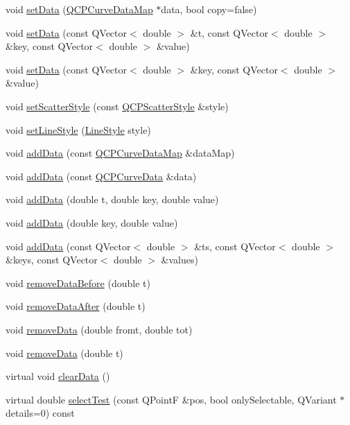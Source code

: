 \begin{DoxyCompactItemize}
\item 
void \hyperlink{classQCPCurve_a631ac886708460013b30052f49cbc9da}{set\-Data} (\hyperlink{qcustomplot_8h_a444d37ec9cb2951b3a7fe443c34d1658}{\-Q\-C\-P\-Curve\-Data\-Map} $\ast$data, bool copy=false)
\item 
void \hyperlink{classQCPCurve_affe80e011e2ced62a88f614acd6ab8d1}{set\-Data} (const \-Q\-Vector$<$ double $>$ \&t, const \-Q\-Vector$<$ double $>$ \&key, const \-Q\-Vector$<$ double $>$ \&value)
\item 
void \hyperlink{classQCPCurve_a963d4c45777deef15848a8f56172d066}{set\-Data} (const \-Q\-Vector$<$ double $>$ \&key, const \-Q\-Vector$<$ double $>$ \&value)
\item 
void \hyperlink{classQCPCurve_a55e43b44709bf50a35500644988aa706}{set\-Scatter\-Style} (const \hyperlink{classQCPScatterStyle}{\-Q\-C\-P\-Scatter\-Style} \&style)
\item 
void \hyperlink{classQCPCurve_a4a377ec863ff81a1875c3094a6177c19}{set\-Line\-Style} (\hyperlink{classQCPCurve_a2710e9f79302152cff794c6e16cc01f1}{\-Line\-Style} style)
\item 
void \hyperlink{classQCPCurve_a4e24023c3b9ac75440c7a260172c99af}{add\-Data} (const \hyperlink{qcustomplot_8h_a444d37ec9cb2951b3a7fe443c34d1658}{\-Q\-C\-P\-Curve\-Data\-Map} \&data\-Map)
\item 
void \hyperlink{classQCPCurve_ad304326aba096911f92452d8bfe0470e}{add\-Data} (const \hyperlink{classQCPCurveData}{\-Q\-C\-P\-Curve\-Data} \&data)
\item 
void \hyperlink{classQCPCurve_a13398b236f6926014e404eeb5b9f415c}{add\-Data} (double t, double key, double value)
\item 
void \hyperlink{classQCPCurve_ada4762e793cd5707b33f35b8a4b0f8fb}{add\-Data} (double key, double value)
\item 
void \hyperlink{classQCPCurve_a27c8b3dddd4067d626397ee199626722}{add\-Data} (const \-Q\-Vector$<$ double $>$ \&ts, const \-Q\-Vector$<$ double $>$ \&keys, const \-Q\-Vector$<$ double $>$ \&values)
\item 
void \hyperlink{classQCPCurve_af6f4284fbc2f34e676f24dce03c34fe5}{remove\-Data\-Before} (double t)
\item 
void \hyperlink{classQCPCurve_a0365cb947c4e6d405ee22e00191d5f52}{remove\-Data\-After} (double t)
\item 
void \hyperlink{classQCPCurve_ad45bb5479be799163028ef2b776f7221}{remove\-Data} (double fromt, double tot)
\item 
void \hyperlink{classQCPCurve_a30c91acfa591ec534c49fed4c0fca39a}{remove\-Data} (double t)
\item 
virtual void \hyperlink{classQCPCurve_ae0462c61dbfbac07db0736ec64110241}{clear\-Data} ()
\item 
virtual double \hyperlink{classQCPCurve_a5af9949e725704811bbc81ecd5970b8e}{select\-Test} (const \-Q\-Point\-F \&pos, bool only\-Selectable, \-Q\-Variant $\ast$details=0) const 
\end{DoxyCompactItemize}
